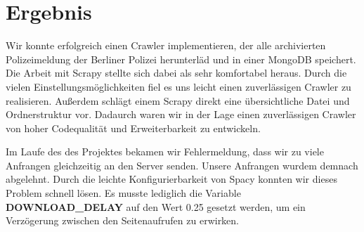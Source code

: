 \section{Ergebnis}

Wir konnte erfolgreich einen Crawler implementieren, der alle archivierten Polizeimeldung der Berliner Polizei herunterläd
und in einer MongoDB speichert. Die Arbeit mit Scrapy stellte sich dabei als sehr komfortabel heraus.
Durch die vielen Einstellungsmöglichkeiten fiel es uns leicht einen zuverlässigen Crawler zu realisieren.
Außerdem schlägt einem Scrapy direkt eine übersichtliche Datei und Ordnerstruktur vor. Dadaurch waren wir in der Lage einen zuverlässigen Crawler
von hoher Codequalität und Erweiterbarkeit zu entwickeln.

Im Laufe des des Projektes bekamen wir Fehlermeldung, dass wir zu viele Anfrangen gleichzeitig an den Server senden.
Unsere Anfrangen wurdem demnach abgelehnt. Durch die leichte Konfigurierbarkeit von Spacy konnten wir dieses Problem schnell lösen.
Es musste lediglich die Variable \textbf{DOWNLOAD\_DELAY} auf den Wert 0.25 gesetzt werden, um ein Verzögerung zwischen den Seitenaufrufen zu
erwirken.



